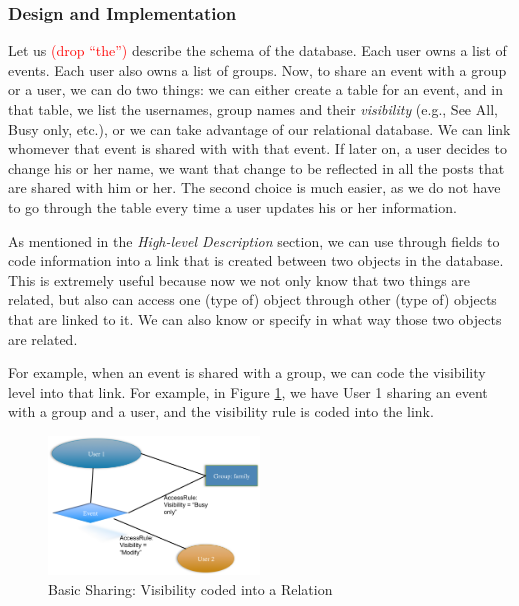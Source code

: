 \documentclass[a4paper]{article}
\newcommand{\comment}[1]{\textcolor{red}{#1}}
\begin{document}
\subsubsection{Design and Implementation}
Let us \comment{(drop ``the'')} describe the schema of the database. Each user owns a list of events. Each user also owns a list of groups. Now, to share an event with a group or a user, we can do two things: we can either create a table for an event, and in that table, we list the usernames, group names and their \emph{visibility} (e.g., See All, Busy only, etc.), or we can  take advantage of our relational database. We can link whomever that event is shared with with that event. If later on, a user decides to change his or her name, we want that change to be reflected in all the posts that are shared with him or her. The second choice is much easier, as we do not have to go through the table every time a user updates his or her information. 

As mentioned in the \emph{High-level Description} section, we can use through fields to code information into a link that is created between two objects in the database. This is extremely useful because now we not only know that two things are related, but also can access one (type of) object through other (type of) objects that are linked to it. We can also know or specify in what way those two objects are related. 

For example, when an event is shared with a group, we can code the visibility level into that link. For example, in Figure \ref{fig:sharing1}, we have User 1 sharing an event with a group and a user, and the visibility rule is coded into the link.

\begin{figure}[h]
\centering
\includegraphics[width=0.5\textwidth]{sharing1.png}
\caption{\label{fig:sharing1}Basic Sharing: Visibility coded into a Relation}
\end{figure}
\end{document}
